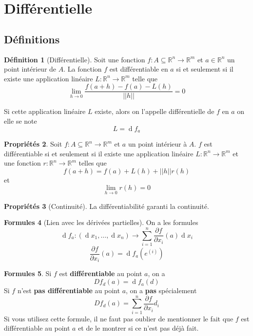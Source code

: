 \documentclass[11pt,a4paper]{article}
\theoremstyle{definition}
\newtheorem{mydef}{Définition}%
\newtheorem{myprop}[mydef]{Propriétés}
\newtheorem{myform}[mydef]{Formules}
\DeclareMathOperator{\diff}{d}
\newcommand{\dif}{\diff\!}
\newcommand{\pa}{\partial}
\newcommand{\R}{\mathbb{R}}
\begin{document}
\section{Différentielle}

\subsection{Définitions}

\begin{mydef}[Différentielle]
	Soit une fonction $f : A \subseteq \R^n \to \R^m$ et $a \in \R^n$ un point intérieur de $A$. La fonction $f$ est différentiable en $a$ si et seulement si il existe une application linéaire $L : \R^n \to \R^m$ telle que
	\[ \lim_{h \to 0} \frac{f(a+h) - f(a) - L(h)}{||h||} = 0 \]

	Si cette application linéaire $L$ existe, alors on l'appelle différentielle de $f$ en $a$ on elle se note
	\[ L = \dif f_a \]
\end{mydef}

\begin{myprop}
	Soit $f : A \subseteq \R^n \to \R^m$ et $a$ un point intérieur à $A$. $f$ est différentiable si et seulement si il existe une application linéaire $L : \R^n \to \R^m$ et une fonction $r : \R^n \to \R^m$ telles que
	\[ f(a+h) = f(a) + L(h) + ||h|| r(h) \]
	et
	\[ \lim_{h \to 0}r(h) = 0 \]
\end{myprop}

\begin{myprop}[Continuité]
	La différentiabilité garanti la continuité.
\end{myprop}

\begin{myform}[Lien avec les dérivées partielles] On a les formules
	\[ \dif f_a : (\dif x_1 , \dots , \dif x_n) \to \sum_{i=1}^n \frac{\pa f}{\pa x_i}(a) \dif x_i \]
	\[ \frac{\pa f}{\pa x_i}(a) = \dif f_a(e^{(i)}) \]
\end{myform}

\begin{myform}
	Si $f$ est \textbf{différentiable} au point $a$, on a
	\[ Df_d(a) = \dif f_a(d) \]
	Si $f$ n'est \textbf{pas différentiable} au point $a$, on a \textbf{pas} spécialement
	\[ Df_d(a) = \sum_{i = 1}^n \frac{\partial f}{\partial x_i}d_i \]
	Si vous utilisez cette formule, il ne faut pas oublier de mentionner le fait que $f$ est différentiable au point $a$
	et de le montrer si ce n'est pas déjà fait.
\end{myform}
\end{document}
